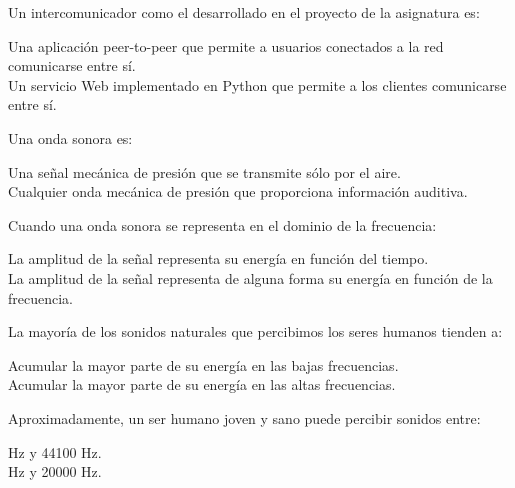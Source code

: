 \documentclass[legalpaper, 12pt, addpoints]{exam}
\begin{document}
\begin{questions}

\question Un intercomunicador como el desarrollado en el proyecto de la asignatura es:

\begin{oneparchoices}
  \choice Una aplicación peer-to-peer que permite a usuarios conectados a la red comunicarse entre sí.\\
  \choice Un servicio Web implementado en Python que permite a los clientes comunicarse entre sí.
\end{oneparchoices}
  
\vspace{0.10in}

\question Una onda sonora es:

\begin{oneparchoices}
  \choice Una señal mecánica de presión que se transmite sólo por el aire.\\
  \choice Cualquier onda mecánica de presión que proporciona información auditiva.
\end{oneparchoices}
  
\question Cuando una onda sonora se representa en el dominio de la frecuencia:

\begin{oneparchoices}
  \choice La amplitud de la señal representa su energía en función del tiempo.\\
  \choice La amplitud de la señal representa de alguna forma su
  energía en función de la frecuencia.
\end{oneparchoices}
  
\vspace{0.10in}

\question La mayoría de los sonidos naturales que percibimos los seres humanos tienden a:

\begin{oneparchoices}
  \choice Acumular la mayor parte de su energía en las bajas frecuencias.\\
  \choice Acumular la mayor parte de su energía en las altas frecuencias.
\end{oneparchoices}
  
\vspace{0.10in}

\question Aproximadamente, un ser humano joven y sano puede percibir sonidos entre:

\begin{oneparchoices}
   Hz y 44100 Hz.\\
   Hz y 20000 Hz.
\end{oneparchoices}
  

\end{questions}
\end{document}
